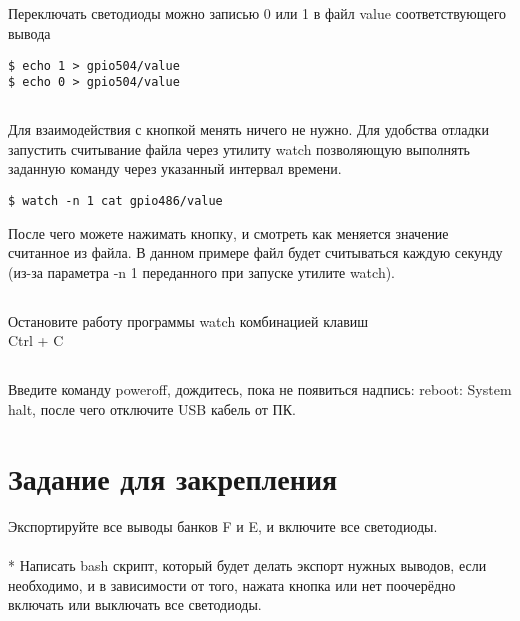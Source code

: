 \subsection{}Переключать светодиоды можно записью 0 или 1 в файл value соответствующего вывода
\begin{lstlisting}[style=bash]
$ echo 1 > gpio504/value
$ echo 0 > gpio504/value
\end{lstlisting}

\subsection{}Для взаимодействия с кнопкой менять ничего не нужно. Для удобства отладки запустить считывание файла через утилиту watch позволяющую выполнять заданную команду через указанный интервал времени.

\begin{lstlisting}[style=bash]
$ watch -n 1 cat gpio486/value
\end{lstlisting}

После чего можете нажимать кнопку, и смотреть как меняется значение считанное из файла. В данном примере файл будет считываться каждую секунду (из-за параметра -n 1 переданного при запуске утилите watch).  

\subsection{}Остановите работу программы watch комбинацией клавиш \\ Ctrl + C

\subsection{}Введите команду poweroff, дождитесь, пока не появиться надпись: reboot: System halt, после чего отключите USB кабель от ПК. 

\section{Задание для закрепления}
Экспортируйте все выводы банков F и E, и включите все светодиоды.
\\\\
* Написать bash скрипт, который будет делать экспорт нужных выводов, если необходимо, и в зависимости от того, нажата кнопка или нет поочерёдно включать или выключать все светодиоды. 